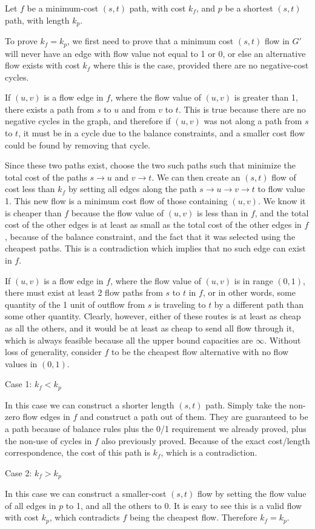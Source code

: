 \documentclass{article}
\begin{document}
Let $f$ be a minimum-cost $(s,t)$ path, with cost $k_f$, and
$p$ be a shortest $(s,t)$ path, with length $k_p$.

To prove $k_f = k_p$, we first need to prove that a minimum cost $(s,t)$ flow
in $G'$ will never have an edge with flow value not equal to 1 or 0, or else
an alternative flow exists with cost $k_f$ where this is the case, provided there
are no negative-cost cycles.

If $(u,v)$ is a flow edge in $f$, where the flow value of $(u,v)$ is greater than 1,
there exists a path from $s$ to $u$ and from $v$ to $t$. This is true because
there are no negative cycles in the graph, and therefore if $(u,v)$ was not
along a path from $s$ to $t$, it must be in a cycle due to the balance
constraints, and a smaller cost flow could be found by removing that cycle.

Since these two paths exist, choose the two such paths such that minimize the
total cost of the paths $s \to u$ and $v \to t$. We can then create an $(s,t)$
flow of cost less than $k_f$ by setting all edges along the path $s \to u \to
v \to t$ to flow value 1. This new flow is a minimum cost flow of those containing
$(u,v)$. We know it is cheaper than $f$ because the flow value of $(u,v)$ is
less than in $f$, and the total cost of the other edges is at least as small
as the total cost of the other edges in $f$, because of the balance
constraint, and the fact that it was selected using the cheapest paths. This is a
contradiction which implies that no such edge can exist in $f$.

If $(u,v)$ is a flow edge in $f$, where the flow value of $(u,v)$ is in range
$(0,1)$, there must exist at least 2 flow paths from $s$ to $t$ in $f$, or in other
words, some quantity of the 1 unit of outflow from $s$ is traveling to $t$ by
a different path than some other quantity. Clearly, however, either of these
routes is at least as cheap as all the others, and it would be at least as cheap to send
all flow through it, which is always feasible because all the upper bound capacities
are $\infty$. Without loss of generality, consider $f$ to be the cheapest flow
alternative with no flow values in $(0,1)$.

Case 1: $k_f < k_p$

In this case we can construct a shorter length $(s,t)$ path. Simply take the
non-zero flow edges in $f$ and construct a path out of them. They are
guaranteed to be a path because of balance rules plus the 0/1 requirement
we already proved, plus the non-use of cycles in $f$ also previously proved.
Because of the exact cost/length correspondence, the cost of this path is
$k_f$, which is a contradiction.

Case 2: $k_f > k_p$

In this case we can construct a smaller-cost $(s,t)$ flow by setting the flow
value of all edges in $p$ to 1, and all the others to 0. It is easy to see
this is a valid flow with cost $k_p$, which contradicts $f$ being the cheapest
flow. Therefore $k_f = k_p$. 
\end{document}
